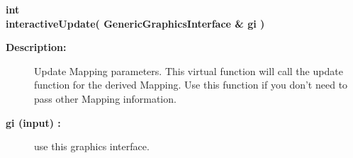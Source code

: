 \begin{flushleft} \textbf{%
int  \\ 
\settowidth{\MappingIncludeArgIndent}{interactiveUpdate(}%
interactiveUpdate( GenericGraphicsInterface \& gi )
}\end{flushleft}
\begin{description}
\item[{\bf Description:}] 
   Update Mapping parameters. This virtual function will call the update function for the
 derived Mapping. Use this function if you don't need to pass other Mapping information.
\item[{\bf gi (input) :}]  use this graphics interface.
\end{description}
